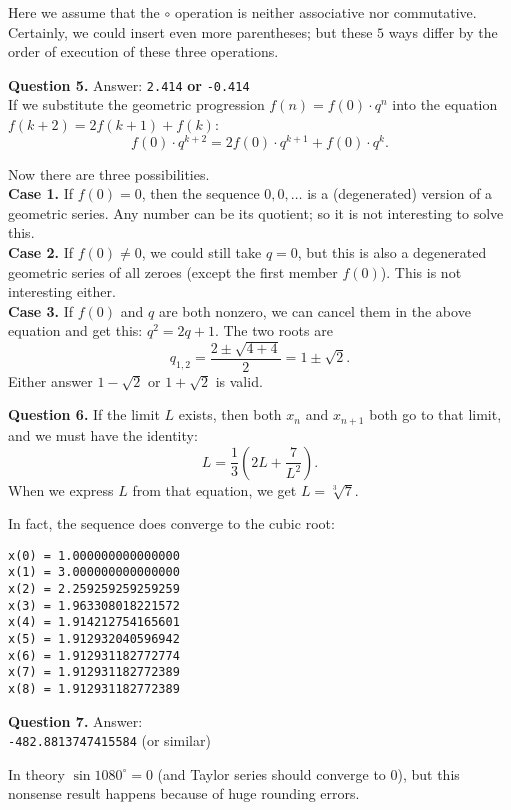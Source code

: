\documentclass[jou]{apa6}
\begin{document}
Here we assume that the $\circ$ operation is neither associative nor commutative. 
Certainly, we could insert even more parentheses; but these $5$ ways differ 
by the order of execution of these three operations.



\vspace{6pt}
{\bf Question 5.} Answer: {\tt 2.414} {\bf or} {\tt -0.414}\\
If we substitute the geometric progression $f(n) = f(0) \cdot q^n$ 
into the equation $f(k+2) = 2f(k+1) + f(k)$: 
$$f(0) \cdot q^{k+2} = 2f(0) \cdot q^{k+1} + f(0) \cdot q^{k}.$$

Now there are three possibilities.\\
{\bf Case 1.} If $f(0) = 0$, then the sequence 
$0,0,\ldots$ is a (degenerated) version of a geometric series. 
Any number can be its quotient; so it is not interesting to solve this.\\
{\bf Case 2.} If $f(0) \neq 0$, we could still take $q = 0$, but this
is also a degenerated geometric series of all zeroes (except the first member $f(0)$).
This is not interesting either.\\
{\bf Case 3.} If $f(0)$ and $q$ are both nonzero, we can cancel them in the
above equation and get this: $q^2 = 2q + 1$. 
The two roots are 
$$q_{1,2} = \frac{2 \pm \sqrt{4 + 4}}{2} = 1 \pm \sqrt{2}.$$
Either answer $1 - \sqrt{2}$ or $1 + \sqrt{2}$ is valid. 




\vspace{6pt}
{\bf Question 6.} If the limit $L$ exists, then both $x_n$ and $x_{n+1}$ both 
go to that limit, and we must have the identity:
$$L = \frac{1}{3}\left( 2L + \frac{7}{L^2} \right).$$
When we express $L$ from that equation, we get $L = \sqrt[3]{7}$. 

In fact, the sequence does converge to the cubic root: 
\begin{verbatim}
x(0) = 1.000000000000000
x(1) = 3.000000000000000
x(2) = 2.259259259259259
x(3) = 1.963308018221572
x(4) = 1.914212754165601
x(5) = 1.912932040596942
x(6) = 1.912931182772774
x(7) = 1.912931182772389
x(8) = 1.912931182772389
\end{verbatim}


\vspace{6pt}
{\bf Question 7.} Answer:\\ {\tt -482.8813747415584} (or similar)

In theory $\sin 1080^{\circ} = 0$ (and Taylor series should converge to $0$), 
but this nonsense result happens because of huge rounding errors.
\end{document}

